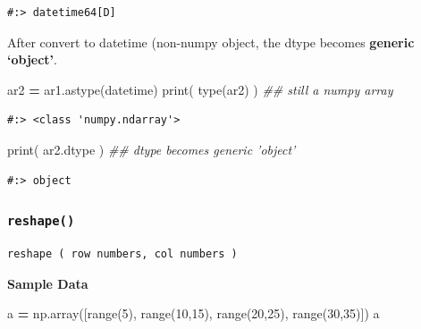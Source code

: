 \documentclass[
]{book}
\newenvironment{Shaded}{\begin{snugshade}}{\end{snugshade}}
\newcommand{\BuiltInTok}[1]{#1}
\newcommand{\CommentTok}[1]{\textcolor[rgb]{0.37,0.37,0.37}{\textit{#1}}}
\newcommand{\DecValTok}[1]{\textcolor[rgb]{0.06,0.06,0.06}{#1}}
\newcommand{\NormalTok}[1]{#1}
\newcommand{\OperatorTok}[1]{\textcolor[rgb]{0.43,0.43,0.43}{\textbf{#1}}}
\begin{document}
\begin{verbatim}
#:> datetime64[D]
\end{verbatim}

After convert to datetime (non-numpy object, the dtype becomes \textbf{generic `object'}.

\begin{Shaded}
\begin{Highlighting}[]
\NormalTok{ar2 }\OperatorTok{=}\NormalTok{ ar1.astype(datetime)}
\BuiltInTok{print}\NormalTok{( }\BuiltInTok{type}\NormalTok{(ar2) )  }\CommentTok{## still a numpy array}
\end{Highlighting}
\end{Shaded}

\begin{verbatim}
#:> <class 'numpy.ndarray'>
\end{verbatim}

\begin{Shaded}
\begin{Highlighting}[]
\BuiltInTok{print}\NormalTok{( ar2.dtype )  }\CommentTok{## dtype becomes generic 'object'}
\end{Highlighting}
\end{Shaded}

\begin{verbatim}
#:> object
\end{verbatim}

\hypertarget{reshape}{%
\subsubsection{\texorpdfstring{\texttt{reshape()}}{reshape()}}\label{reshape}}

\begin{verbatim}
reshape ( row numbers, col numbers )
\end{verbatim}

\textbf{Sample Data}

\begin{Shaded}
\begin{Highlighting}[]
\NormalTok{a }\OperatorTok{=}\NormalTok{ np.array([}\BuiltInTok{range}\NormalTok{(}\DecValTok{5}\NormalTok{), }\BuiltInTok{range}\NormalTok{(}\DecValTok{10}\NormalTok{,}\DecValTok{15}\NormalTok{), }\BuiltInTok{range}\NormalTok{(}\DecValTok{20}\NormalTok{,}\DecValTok{25}\NormalTok{), }\BuiltInTok{range}\NormalTok{(}\DecValTok{30}\NormalTok{,}\DecValTok{35}\NormalTok{)])}
\NormalTok{a}
\end{Highlighting}
\end{Shaded}
\end{document}
